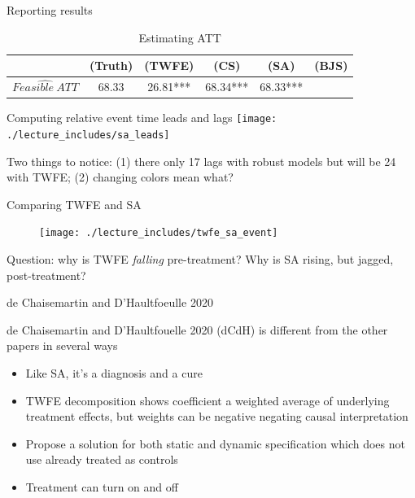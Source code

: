 \documentclass{beamer}
\begin{document}
\begin{frame}{Reporting results}
\begin{table}[htbp]\centering
\small
\caption{Estimating ATT}
\begin{center}
\begin{tabular}{l*{5}{c}}
\hline
\multicolumn{1}{l}{\textbf{}}&
\multicolumn{1}{c}{\textbf{(Truth)}}&
\multicolumn{1}{c}{\textbf{(TWFE)}}&
\multicolumn{1}{c}{\textbf{(CS)}}&
\multicolumn{1}{c}{\textbf{(SA)}}&
\multicolumn{1}{c}{\textbf{(BJS)}}\\
\hline
$\widehat{Feasible\ ATT}$  & 68.33    & 26.81*** & 68.34*** & 68.33***&\\
\hline
\end{tabular}
\end{center}
\end{table}

\end{frame}

\begin{frame}{Computing relative event time leads and lags }
             \texttt{[image: ./lecture\_includes/sa\_leads]}

Two things to notice: (1) there only 17 lags with robust models but will be 24 with TWFE; (2) changing colors mean what?

\end{frame}

\begin{frame}{Comparing TWFE and SA }

\begin{figure}
\begin{center}
             \texttt{[image: ./lecture\_includes/twfe\_sa\_event]}
\end{center}
\end{figure}

Question: why is TWFE \emph{falling} pre-treatment?  Why is SA rising, but jagged, post-treatment?

\end{frame}


\begin{frame}{de Chaisemartin and D'Haultfoeulle 2020}

de Chaisemartin and D'Haultfouelle 2020 (dCdH) is different from the other papers in several ways
	\begin{itemize}
	\item Like SA, it's a diagnosis and a cure
	\item TWFE decomposition shows coefficient a weighted average of underlying treatment effects, but weights can be negative negating causal interpretation
	\item Propose a solution for both static and dynamic specification which does not use already treated as controls
	\item Treatment can turn on and off
	\end{itemize}

\end{frame}
\end{document}
